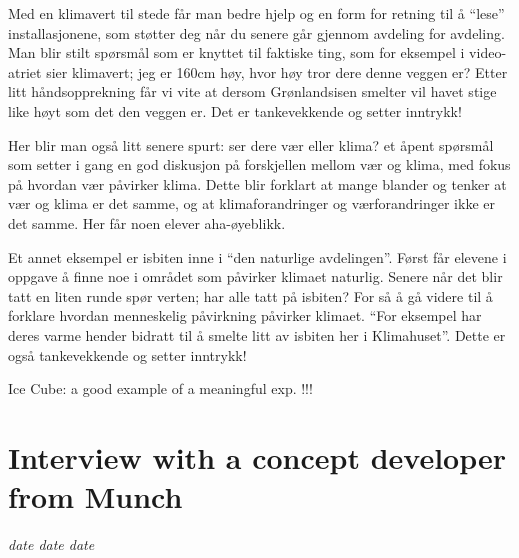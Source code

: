 Med en klimavert til stede får man bedre hjelp og en form for retning til å “lese” installasjonene, som støtter deg når du senere går gjennom avdeling for avdeling. 
Man blir stilt spørsmål som er knyttet til faktiske ting, som for eksempel i video-atriet sier klimavert; jeg er 160cm høy, hvor høy tror dere denne veggen er?
Etter litt håndsopprekning får vi vite at dersom Grønlandsisen smelter vil havet stige like høyt som det den veggen er. Det er tankevekkende og setter inntrykk!

Her blir man også litt senere spurt: ser dere vær eller klima? et åpent spørsmål som setter i gang en god diskusjon på forskjellen mellom vær og klima, med fokus på hvordan vær påvirker klima. Dette blir forklart at mange blander og tenker at vær og klima er det samme, og at klimaforandringer og værforandringer ikke er det samme. Her får noen elever aha-øyeblikk.


Et annet eksempel er isbiten inne i “den naturlige avdelingen”.  Først får elevene i oppgave å finne noe i området som påvirker klimaet naturlig. Senere når det blir tatt en liten runde spør verten; har alle tatt på isbiten? For så å gå videre til å forklare hvordan menneskelig påvirkning påvirker klimaet. “For eksempel har deres varme hender bidratt til å smelte litt av isbiten her i Klimahuset”. Dette er også tankevekkende og setter inntrykk!


Ice Cube: a good example of a meaningful exp. !!!


\section{Interview with a concept developer from Munch}
\par
\emph{date date date}
\par


